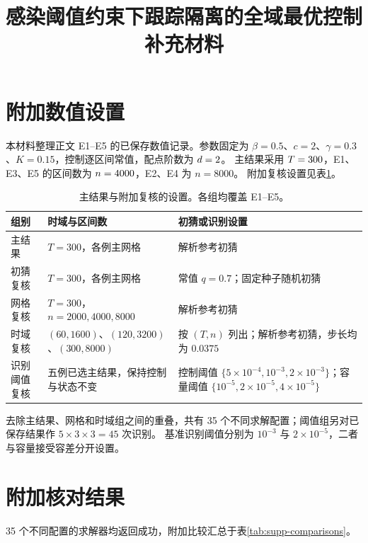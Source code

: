 \documentclass[11pt,a4paper,UTF8]{ctexart}
\title{\bfseries 感染阈值约束下跟踪隔离的全域最优控制\\[0.4em]\large 补充材料}
\author{}
\date{}
\begin{document}
\maketitle

\section{附加数值设置}
\label{sec:supp-settings}

本材料整理正文 E1--E5 的已保存数值记录。参数固定为
$\beta=0.5$、$c=2$、$\gamma=0.3$、$K=0.15$，控制逐区间常值，配点阶数为 $d=2$。
主结果采用 $T=300$，E1、E3、E5 的区间数为 $n=4000$，E2、E4 为 $n=8000$。
附加复核设置见表\ref{tab:supp-settings}。

\begin{table}[H]
\centering\small
\caption{主结果与附加复核的设置。各组均覆盖 E1--E5。}
\label{tab:supp-settings}
\begin{tabularx}{\linewidth}{@{}>{\raggedright\arraybackslash}p{2.0cm}>{\raggedright\arraybackslash}p{3.4cm}>{\raggedright\arraybackslash}X@{}}
\toprule
组别 & 时域与区间数 & 初猜或识别设置\\
\midrule
主结果 & $T=300$，各例主网格 & 解析参考初猜\\
初猜复核 & $T=300$，各例主网格 & 常值 $q=0.7$；固定种子随机初猜\\
网格复核 & $T=300$，$n=2000,4000,8000$ & 解析参考初猜\\
时域复核 & $(60,1600)$、$(120,3200)$、$(300,8000)$ & 按 $(T,n)$ 列出；解析参考初猜，步长均为 $0.0375$\\
识别阈值复核 & 五例已选主结果，保持控制与状态不变 & 控制阈值 $\{5\!\times\!10^{-4},10^{-3},2\!\times\!10^{-3}\}$；容量阈值 $\{10^{-5},2\!\times\!10^{-5},4\!\times\!10^{-5}\}$\\
\bottomrule
\end{tabularx}
\end{table}

去除主结果、网格和时域组之间的重叠，共有 35 个不同求解配置；阈值组另对已保存结果作 $5\times3\times3=45$ 次识别。
基准识别阈值分别为 $10^{-3}$ 与 $2\times10^{-5}$，二者与容量接受容差分开设置。

\section{附加核对结果}
\label{sec:supp-results}

35 个不同配置的求解器均返回成功，附加比较汇总于表\ref{tab:supp-comparisons}。
\end{document}
